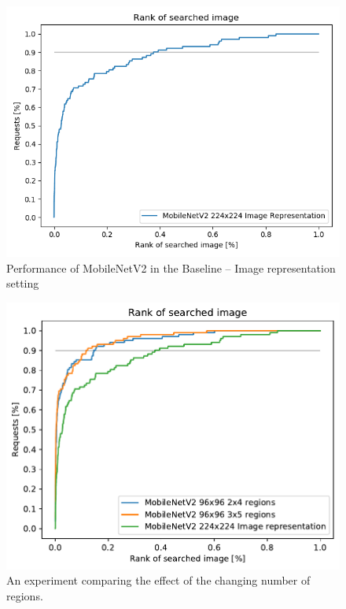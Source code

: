 \begin{figure}
    \centering
    \includegraphics[width=0.8\linewidth]{img/mobilenet_whole_image.png}
    \caption{Performance of MobileNetV2 in the Baseline -- Image representation setting}
    \label{fig:mobilenet_whole_image_example}
\end{figure}

\begin{figure}
\centering
\includegraphics[width=0.8\linewidth]{graphs/0c36458e4a7754f349e4dd02e823acc5f192f0aaa42647313045530525f3db19.pdf}
\caption{An experiment comparing the effect of the changing number of regions.}
\label{fig:different_number_regions}
\end{figure}

